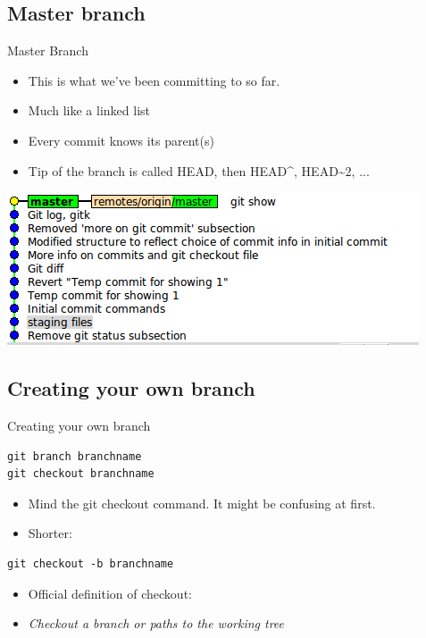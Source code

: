 \documentclass[10pt,a4paper]{beamer}
\begin{document}
\subsection{Master branch}
\begin{frame}{Master Branch}
\begin{itemize}
\item This is what we've been committing to so far.
\item Much like a linked list
\item Every commit knows its parent(s)
\item Tip of the branch is called HEAD, then HEAD\^{}, HEAD\~{}2, ...
\end{itemize}
\includegraphics[width=\linewidth]{masterbranch.png}
\end{frame}

\subsection{Creating your own branch}
\begin{frame}[fragile]{Creating your own branch}
\begin{verbatim}
git branch branchname
git checkout branchname
\end{verbatim}
\begin{itemize}
\item Mind the git checkout command. It might be confusing at first.
\item Shorter:
\end{itemize}

\begin{verbatim}
git checkout -b branchname
\end{verbatim}
\begin{itemize}
\item Official definition of checkout:
\item \textit{Checkout a branch or paths to the working tree}
\end{itemize}
\end{frame}
\end{document}
